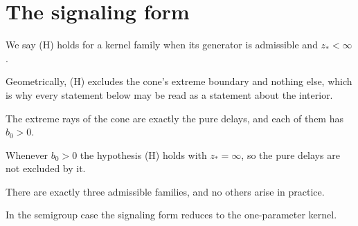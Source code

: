 \section{The signaling form}\label{sec:signaling}

\begin{definition}\label{def:standing-hypothesis}
  We say (H) holds for a kernel family when its generator is admissible and
  $z_* < \infty$.
\end{definition}

Geometrically, (H) excludes the cone's extreme boundary and nothing else, which is
why every statement below may be read as a statement about the interior.

\begin{proposition}\label{prop:extreme-rays}
  The extreme rays of the cone are exactly the pure delays, and each of them has
  $b_0 > 0$.
\end{proposition}

\begin{remark}\label{rem:extreme-rays}
  Whenever $b_0 > 0$ the hypothesis (H) holds with $z_* = \infty$, so the pure delays
  are not excluded by it.
\end{remark}

There are exactly three admissible families, and no others arise in practice.

\begin{corollary}\label{cor:semigroup-case}
  In the semigroup case the signaling form reduces to the one-parameter kernel.
\end{corollary}
